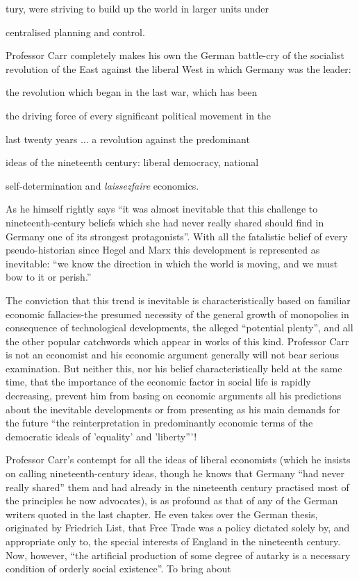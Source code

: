 \documentclass[11pt,openany]{book}
\begin{document}
tury, were striving to build up the world in larger units under

centralised planning and control.

Professor Carr completely makes his own the German battle-cry of the socialist revolution of the East against the liberal West in which Germany was the leader:

the revolution which began in the last war, which has been

the driving force of every significant political movement in the

last twenty years ... a revolution against the predominant

ideas of the nineteenth century: liberal democracy, national

self-determination and \emph{laissezfaire} economics.

As he himself rightly says ``it was almost inevitable that this challenge to nineteenth-century beliefs which she had never really shared should find in Germany one of its strongest protagonists''. With all the fatalistic belief of every pseudo-historian since Hegel and Marx this development is represented as inevitable: ``we know the direction in which the world is moving, and we must bow to it or perish.''

The conviction that this trend is inevitable is characteristically based on familiar economic fallacies-the presumed necessity of the general growth of monopolies in consequence of technological developments, the alleged ``potential plenty'', and all the other popular catchwords which appear in works of this kind. Professor Carr is not an economist and his economic argument generally will not bear serious examination. But neither this, nor his belief characteristically held at the same time, that the importance of the economic factor in social life is rapidly decreasing, prevent him from basing on economic arguments all his predictions about the inevitable developments or from presenting as his main demands for the future ``the reinterpretation in predominantly economic terms of the democratic ideals of 'equality' and 'liberty'''!

Professor Carr's contempt for all the ideas of liberal economists (which he insists on calling nineteenth-century ideas, though he knows that Germany ``had never really shared'' them and had already in the nineteenth century practised most of the principles he now advocates), is as profound as that of any of the German writers quoted in the last chapter. He even takes over the German thesis, originated by Friedrich List, that Free Trade was a policy dictated solely by, and appropriate only to, the special interests of England in the nineteenth century. Now, however, ``the artificial production of some degree of autarky is a necessary condition of orderly social existence''. To bring about
\end{document}
